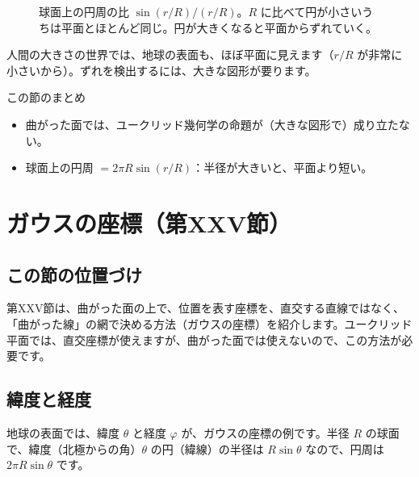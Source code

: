 \documentclass[a4paper,11pt,openany]{ltjsbook}
\begin{document}
\begin{figure}[htbp]
\centering
{}
\caption{球面上の円周の比 $\sin(r/R)/(r/R)$。$R$ に比べて円が小さいうちは平面とほとんど同じ。円が大きくなると平面からずれていく。}
\end{figure}

人間の大きさの世界では、地球の表面も、ほぼ平面に見えます（$r/R$ が非常に小さいから）。ずれを検出するには、大きな図形が要ります。

\begin{pointbox}{この節のまとめ}
\begin{itemize}[leftmargin=*]
\item 曲がった面では、ユークリッド幾何学の命題が（大きな図形で）成り立たない。
\item 球面上の円周 $=2\pi R\sin(r/R)$：半径が大きいと、平面より短い。
\end{itemize}
\end{pointbox}

\chapter{ガウスの座標（第XXV節）}

\section{この節の位置づけ}

第XXV節は、曲がった面の上で、位置を表す座標を、直交する直線ではなく、「曲がった線」の網で決める方法（ガウスの座標）を紹介します。ユークリッド平面では、直交座標が使えますが、曲がった面では使えないので、この方法が必要です。

\section{緯度と経度}

地球の表面では、緯度 $\theta$ と経度 $\varphi$ が、ガウスの座標の例です。半径 $R$ の球面で、緯度（北極からの角）$\theta$ の円（緯線）の半径は $R\sin\theta$ なので、円周は $2\pi R\sin\theta$ です。
\end{document}
